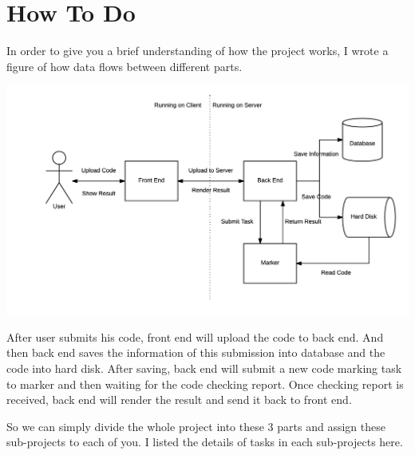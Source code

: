 \documentclass[12pt,a4paper]{article}
\begin{document}
\section{How To Do}
In order to give you a brief understanding of how the project works, I wrote a figure of how data flows between different parts.

\includegraphics[scale=0.7]{flow-diagram.png}

After user submits his code, front end will upload the code to back end. And then back end saves the information of this submission into database and the code into hard disk. After saving, back end will submit a new code marking task to marker and then waiting for the code checking report. Once checking report is received, back end will render the result and send it back to front end.

So we can simply divide the whole project into these 3 parts and assign these sub-projects to each of you. I listed the details of tasks in each sub-projects here.
\end{document}
